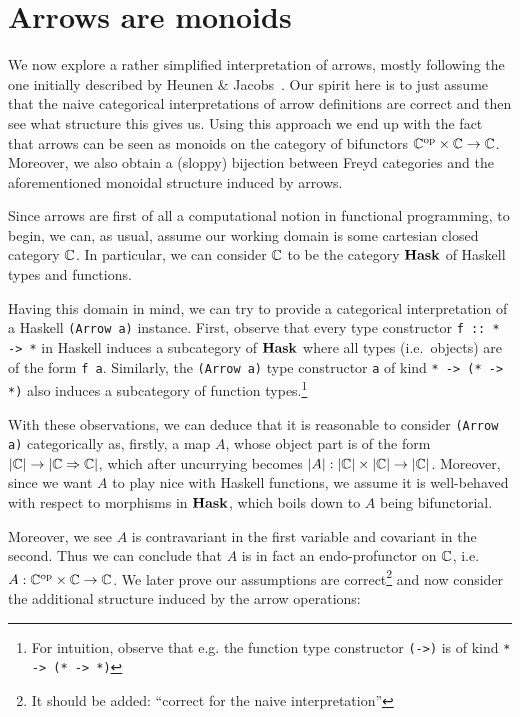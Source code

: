 \section{Arrows are monoids}


We now explore a rather simplified interpretation of arrows, mostly following
the one initially described by Heunen \& Jacobs~\cite{arr-like-mon}. Our spirit
here is to just assume that the naive categorical interpretations of arrow
definitions are correct and then see what structure this gives us.
Using this approach we end up with the fact that arrows can be seen as monoids
on the category of bifunctors ${\mathbb{C}}^{\text{op}} \times \mathbb{C} \to \mathbb{C}$.
Moreover, we also obtain a (sloppy) bijection between Freyd categories and
the aforementioned monoidal structure induced by arrows.

Since arrows are first of all a computational notion in functional programming,
to begin, we can, as usual, assume our working domain is some cartesian closed
category $\mathbb{C}$. In particular, we can consider $\mathbb{C}$ to be the category
$\mathbf{Hask}$ of Haskell types and functions.

Having this domain in mind, we can try to provide a categorical interpretation
of a Haskell \verb|(Arrow a)| instance. First, observe that every type
constructor \verb|f :: * -> *| in Haskell induces a subcategory of $\mathbf{Hask}$
where all types (i.e.~objects) are of the form \verb|f a|.  Similarly,
the \verb|(Arrow a)| type constructor \verb|a| of kind \verb|* -> (* -> *)|
also induces a subcategory of function types.\footnote{%
For intuition, observe that e.g. the function type constructor
\texttt{(->)} is of kind \texttt{* -> (* -> *)}}

With these observations, we can deduce that it is reasonable to consider
\verb|(Arrow a)| categorically as, firstly, a map $A$, whose object part is
of the form $|\mathbb{C}| \to |\mathbb{C} \Rightarrow \mathbb{C}|$, which after uncurrying
becomes $|A|: |\mathbb{C}| \times |\mathbb{C}| \to |\mathbb{C}|$. Moreover, since we want $A$
to play nice with Haskell functions, we assume it is well-behaved with respect
to morphisms in $\mathbf{Hask}$, which boils down to $A$ being bifunctorial.

Moreover, we see $A$ is contravariant in the first variable and covariant in
the second. Thus we can conclude that $A$ is in fact an endo-profunctor on
$\mathbb{C}$, i.e.~$A: {\mathbb{C}}^{\text{op}} \times \mathbb{C} \to \mathbb{C}$. We later prove our
assumptions are correct\footnote{It should be added: ``correct for the naive
interpretation''} and now consider the additional structure induced by
the arrow operations:

